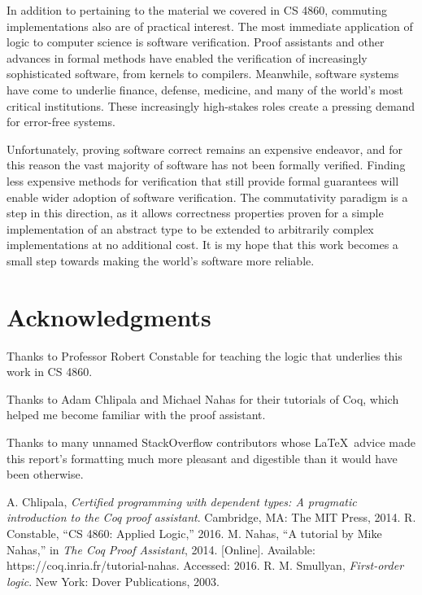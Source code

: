 \documentclass[12pt]{article}
\begin{document}
  \bigskip


  \noindent In addition to pertaining to the material we covered in CS 4860, commuting implementations also are of practical interest. The most immediate application of logic to computer science is software verification. Proof assistants and other advances in formal methods have enabled the verification of increasingly sophisticated software, from kernels to compilers. Meanwhile, software systems have come to underlie finance, defense, medicine, and many of the world's most critical institutions. These increasingly high-stakes roles create a pressing demand for error-free systems.

  \bigskip

  \noindent Unfortunately, proving software correct remains an expensive endeavor, and for this reason the vast majority of software has not been formally verified. Finding less expensive methods for verification that still provide formal guarantees will enable wider adoption of software verification. The commutativity paradigm is a step in this direction, as it allows correctness properties proven for a simple implementation of an abstract type to be extended to arbitrarily complex implementations at no additional cost. It is my hope that this work becomes a small step towards making the world's software more reliable.

\section{Acknowledgments}

  Thanks to Professor Robert Constable for teaching the logic that underlies this work in CS 4860.

  \bigskip

  \noindent Thanks to Adam Chlipala and Michael Nahas for their tutorials of Coq, which helped me become familiar with the proof assistant.

  \bigskip

  \noindent Thanks to many unnamed StackOverflow contributors whose \LaTeX \ advice made this report's formatting much more pleasant and digestible than it would have been otherwise.

\begin{thebibliography}{9}
   A. Chlipala, \textit{Certified programming with dependent types: A pragmatic introduction to the Coq proof assistant}. Cambridge, MA: The MIT Press, 2014.
   R. Constable, ``CS 4860: Applied Logic,'' 2016.
   M. Nahas, ``A tutorial by Mike Nahas,'' in \textit{The Coq Proof Assistant}, 2014. [Online]. Available: https://coq.inria.fr/tutorial-nahas. Accessed: 2016.
   R. M. Smullyan, \textit{First-order logic}. New York: Dover Publications, 2003.

\end{thebibliography}
\end{document}
